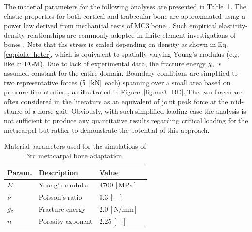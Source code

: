 \documentclass[onecolumn]{svjour3}
\begin{document}
The material parameters for the following analyses are presented in Table~\ref{tab:parameters_mc3}. 
The elastic properties for both cortical and trabecular bone are approximated using a power law derived from mechanical tests of MC3 bone~\cite{Les1994}. 
Such empirical elasticity-density relationships are commonly adopted in finite element investigations of bones \citep{helgason2008mathematical}. 
Note that the stress is scaled depending on density as shown in Eq.\ref{eq:piola_heter}, which is equivalent to spatially varying Young's modulus (e.g. like in FGM). Due to lack of experimental data, the fracture energy $g_{\text c}$ is assumed constant for the entire domain. 
Boundary conditions are simplified to two representative forces (5~$\text{[kN]}$~each) spanning over a small area based on pressure film studies~\cite{Brama2001}, as illustrated in Figure~\ref{fig:mc3_BC}. 
The two forces are often considered in the literature as an equivalent of joint peak force at the mid-stance of a horse gait. Obviously, with such simplified loading case the analysis is not sufficient to produce any quantitative results regarding critical loading for the metacarpal but rather to demonstrate the potential of this approach. 
\begin{table}[h]
	\centering
	\begin{tabular}{lll}
		\hline
		 Param.             & Description                  & Value  \\ \hline
		$E  $                 & Young's modulus              & $4700 \,\mathrm{ [MPa]}$ ~\cite{Les1994} \\
		$\nu  $               & Poisson's ratio                & $0.3 \,\mathrm{ [-]}$ \\
		$g_{\text c}$					&	Fracture energy							 &  $2.0\,[\mathrm{ N/mm}]$ \\
		$n$                   & Porosity exponent            & $2.25 \,\mathrm{ [-]}$     ~\cite{Les1994}   \\ 
		\hline
	\end{tabular} 
	\caption{Material parameters used for the simulations of 3rd metacarpal bone adaptation.}
	\label{tab:parameters_mc3}
\end{table}
\end{document}
